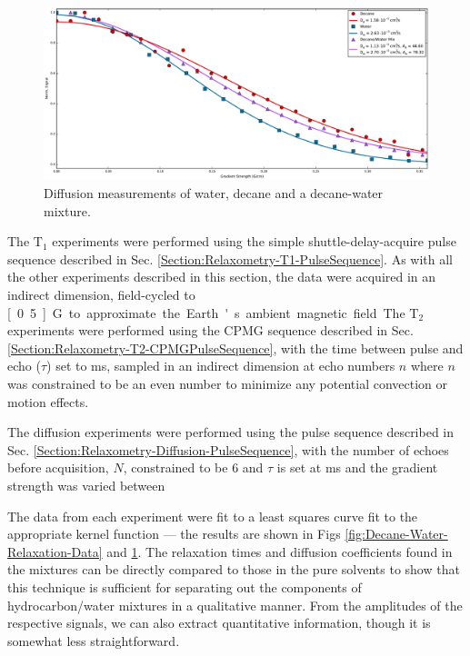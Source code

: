 \documentclass[PaulGanssle-Thesis.tex]{subfiles}
\begin{document}
\begin{figure}[h!]
    \centering
    \includegraphics[width=\textwidth]{figures/relaxometry/decane-water-diff.pdf}
    \caption{Diffusion measurements of water, decane and a decane-water mixture.}
    \label{fig:Decane-Water-Diffusion-Data}
\end{figure}

The $\mathrm{T}_{1}$ experiments were performed using the simple shuttle-delay-acquire pulse sequence described in Sec. \ref{Section:Relaxometry-T1-PulseSequence}. As with all the other experiments described in this section, the data were acquired in an indirect dimension, field-cycled to \unit[0.5]{G} to approximate the Earth's ambient magnetic field.

The $\mathrm{T}_{2}$ experiments were performed using the CPMG sequence described in Sec. \ref{Section:Relaxometry-T2-CPMGPulseSequence}, with the time between pulse and echo ($\tau$) set to \unit[5]{ms}, sampled in an indirect dimension at echo numbers $n$ where $n$ was constrained to be an even number to minimize any potential convection or motion effects.

The diffusion experiments were performed using the pulse sequence described in Sec. \ref{Section:Relaxometry-Diffusion-PulseSequence}, with the number of echoes before acquisition, $N$, constrained to be 6 and $\tau$ is set at \unit[75]{ms} and the gradient strength was varied between 

The data from each experiment were fit to a least squares curve fit to the appropriate kernel function --- the results are shown in Figs \ref{fig:Decane-Water-Relaxation-Data} and \ref{fig:Decane-Water-Diffusion-Data}. The relaxation times and diffusion coefficients found in the mixtures can be directly compared to those in the pure solvents to show that this technique is sufficient for separating out the components of hydrocarbon/water mixtures in a qualitative manner. From the amplitudes of the respective signals, we can also extract quantitative information, though it is somewhat less straightforward.
\end{document}
